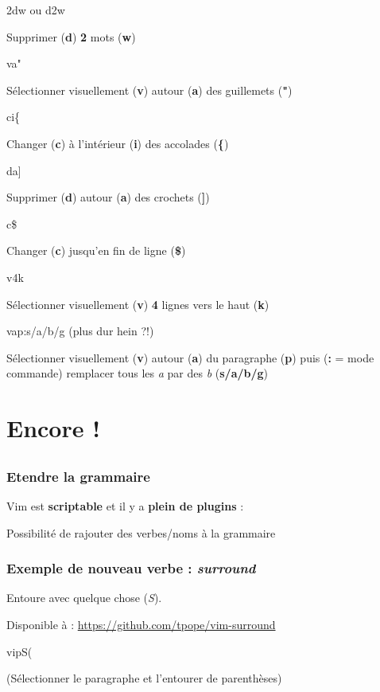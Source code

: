 \documentclass{beamer}
\begin{document}
\begin{frame}
\begin{center}
2dw ou d2w
\pause{}

Supprimer ({\bf d}) {\bf 2} mots ({\bf w})
\pause{}

va"
\pause{}

Sélectionner visuellement ({\bf v}) autour ({\bf a}) des guillemets ({\bf "})
\pause{}

ci\{
\pause{}

Changer ({\bf c}) à l'intérieur ({\bf i}) des accolades ({\bf \{})
\pause{}

da]
\pause{}

Supprimer ({\bf d}) autour ({\bf a}) des crochets ({\bf ]})
\pause{}

c\$
\pause{}

Changer ({\bf c}) jusqu'en fin de ligne ({\bf \$})
\pause{}

v4k
\pause{}

Sélectionner visuellement ({\bf v}) {\bf 4} lignes vers le haut ({\bf k})
\pause{}

vap:s/a/b/g (plus dur hein ?!)
\pause{}

Sélectionner visuellement ({\bf v}) autour ({\bf a}) du paragraphe ({\bf p}) puis ({\bf :} = mode commande) remplacer tous les {\it a} par des {\it b} ({\bf s/a/b/g})
\end{center}
\end{frame}

\section{Encore !}
\subsection{}
\frame{\tableofcontents[currentsection]}

\begin{frame}
\frametitle{Etendre la grammaire}

Vim est {\bf scriptable} et il y a {\bf plein de plugins} :

\begin{center}
Possibilité de rajouter des verbes/noms à la grammaire
\end{center}
\end{frame}

\begin{frame}
\frametitle{Exemple de nouveau verbe : {\it surround}}

Entoure avec quelque chose ({\it S}).

Disponible à : \url{https://github.com/tpope/vim-surround}

\pause{}
\begin{center}
    vipS(
    \pause{}

    (Sélectionner le paragraphe et l'entourer de parenthèses)
\end{center}
\end{frame}
\end{document}
